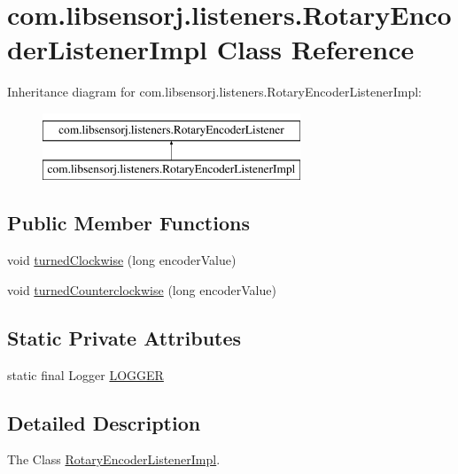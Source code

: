 \hypertarget{classcom_1_1libsensorj_1_1listeners_1_1RotaryEncoderListenerImpl}{}\section{com.\+libsensorj.\+listeners.\+Rotary\+Encoder\+Listener\+Impl Class Reference}
\label{classcom_1_1libsensorj_1_1listeners_1_1RotaryEncoderListenerImpl}
Inheritance diagram for com.\+libsensorj.\+listeners.\+Rotary\+Encoder\+Listener\+Impl\+:\begin{figure}[H]
\begin{center}
\leavevmode
\includegraphics[height=2.000000cm]{classcom_1_1libsensorj_1_1listeners_1_1RotaryEncoderListenerImpl}
\end{center}
\end{figure}
\subsection*{Public Member Functions}
\begin{DoxyCompactItemize}
\item 
void \hyperlink{classcom_1_1libsensorj_1_1listeners_1_1RotaryEncoderListenerImpl_a3dbffe8a20820933fc5910d0aecf5212}{turned\+Clockwise} (long encoder\+Value)
\item 
void \hyperlink{classcom_1_1libsensorj_1_1listeners_1_1RotaryEncoderListenerImpl_a7c07901b6fbfe89c7406afa8fcf4d482}{turned\+Counterclockwise} (long encoder\+Value)
\end{DoxyCompactItemize}
\subsection*{Static Private Attributes}
\begin{DoxyCompactItemize}
\item 
static final Logger \hyperlink{classcom_1_1libsensorj_1_1listeners_1_1RotaryEncoderListenerImpl_af88de2de8fdc7d0d31d454648560aa41}{L\+O\+G\+G\+E\+R}
\end{DoxyCompactItemize}


\subsection{Detailed Description}
The Class \hyperlink{classcom_1_1libsensorj_1_1listeners_1_1RotaryEncoderListenerImpl}{Rotary\+Encoder\+Listener\+Impl}. 

